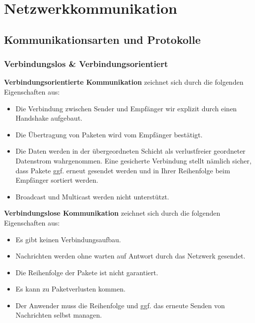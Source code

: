 \section{Netzwerkkommunikation}
\subsection{Kommunikationsarten und Protokolle}
\subsubsection{Verbindungslos \& Verbindungsorientiert}
\textbf{Verbindungsorientierte Kommunikation} zeichnet sich durch die folgenden Eigenschaften aus:
\begin{itemize}
    \item Die Verbindung zwischen Sender und Empfänger wir explizit durch einen Handshake aufgebaut.
    \item Die Übertragung von Paketen wird vom Empfänger bestätigt.
    \item Die Daten werden in der übergeordneten Schicht als verlustfreier geordneter Datenstrom wahrgenommen. Eine gesicherte Verbindung stellt nämlich sicher, dass Pakete ggf. erneut gesendet werden und in Ihrer Reihenfolge beim Empfänger sortiert werden.
    \item Broadcast und Multicast werden nicht unterstützt.
\end{itemize}
\textbf{Verbindungslose Kommunikation} zeichnet sich durch die folgenden Eigenschaften aus:
\begin{itemize}
    \item Es gibt keinen Verbindungsaufbau.
    \item Nachrichten werden ohne warten auf Antwort durch das Netzwerk gesendet.
    \item Die Reihenfolge der Pakete ist nicht garantiert.
    \item Es kann zu Paketverlusten kommen.
    \item Der Anwender muss die Reihenfolge und ggf. das erneute Senden von Nachrichten selbst managen.
\end{itemize}

